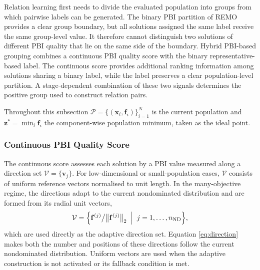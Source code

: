 \documentclass[final,5p,times,twocolumn]{elsarticle}
\newcommand{\vf}{\mathbf{f}}
\newcommand{\vx}{\mathbf{x}}
\newcommand{\vv}{\mathbf{v}}
\newcommand{\vz}{\mathbf{z}}
\begin{document}
Relation learning first needs to divide the evaluated population into groups
from which pairwise labels can be generated. The binary PBI partition of
REMO~\cite{ref:remo} provides a clear group boundary, but all solutions assigned
the same label receive the same group-level value. It therefore cannot
distinguish two solutions of different PBI quality that lie on the same side of
the boundary. Hybrid PBI-based grouping combines a continuous PBI quality score
with the binary representative-based label. The continuous score provides
additional ranking information among solutions sharing a binary label, while
the label preserves a clear population-level partition. A stage-dependent
combination of these two signals determines the positive group used to construct
relation pairs.

Throughout this subsection $\mathcal{P}=\{(\vx_i,\vf_i)\}_{i=1}^{N}$ is the
current population and $\vz^{*}=\min_i\vf_i$ the component-wise population
minimum, taken as the ideal point.

\subsubsection{Continuous PBI Quality Score}
\label{sec:method:hpc:cont}

The continuous score assesses each solution by a PBI value measured along a
direction set $\mathcal{V}=\{\vv_j\}$. For low-dimensional or small-population
cases, $\mathcal{V}$ consists of uniform reference vectors normalised to unit
length. In the many-objective regime, the directions adapt to the current
nondominated distribution and are formed from its radial unit vectors,
\begin{equation}
\mathcal{V}=\Bigl\{\vf^{(j)}\big/\bigl\|\vf^{(j)}\bigr\|_2
\;\Bigm|\;j=1,\ldots,n_{\mathrm{ND}}\Bigr\},
\label{eq:direction}
\end{equation}
which are used directly as the adaptive direction set. Equation
\eqref{eq:direction} makes both the number and positions of these directions
follow the current nondominated distribution. Uniform vectors are used when the
adaptive construction is not activated or its fallback condition is met.
\end{document}
